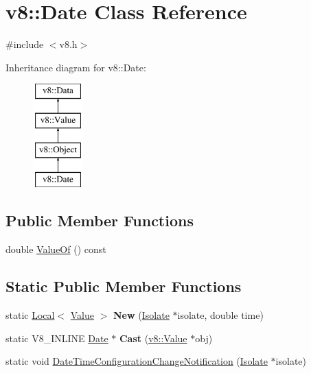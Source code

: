 \hypertarget{classv8_1_1Date}{\section{v8\-:\-:Date Class Reference}
\label{classv8_1_1Date}
}


{\ttfamily \#include $<$v8.\-h$>$}

Inheritance diagram for v8\-:\-:Date\-:\begin{figure}[H]
\begin{center}
\leavevmode
\includegraphics[height=4.000000cm]{classv8_1_1Date}
\end{center}
\end{figure}
\subsection*{Public Member Functions}
\begin{DoxyCompactItemize}
\item 
double \hyperlink{classv8_1_1Date_a06800409271fe5fa74202e0fd1ec8e87}{Value\-Of} () const 
\end{DoxyCompactItemize}
\subsection*{Static Public Member Functions}
\begin{DoxyCompactItemize}
\item 
\hypertarget{classv8_1_1Date_a5f93eb196aa81f4564a8903aeb88cabb}{static \hyperlink{classv8_1_1Local}{Local}$<$ \hyperlink{classv8_1_1Value}{Value} $>$ {\bfseries New} (\hyperlink{classv8_1_1Isolate}{Isolate} $\ast$isolate, double time)}\label{classv8_1_1Date_a5f93eb196aa81f4564a8903aeb88cabb}

\item 
\hypertarget{classv8_1_1Date_a8e5ea7c1f28924b82922270d6596b4d3}{static V8\-\_\-\-I\-N\-L\-I\-N\-E \hyperlink{classv8_1_1Date}{Date} $\ast$ {\bfseries Cast} (\hyperlink{classv8_1_1Value}{v8\-::\-Value} $\ast$obj)}\label{classv8_1_1Date_a8e5ea7c1f28924b82922270d6596b4d3}

\item 
static void \hyperlink{classv8_1_1Date_adb084ec0683d3d195ad0f78af5f6f72b}{Date\-Time\-Configuration\-Change\-Notification} (\hyperlink{classv8_1_1Isolate}{Isolate} $\ast$isolate)
\end{DoxyCompactItemize}


